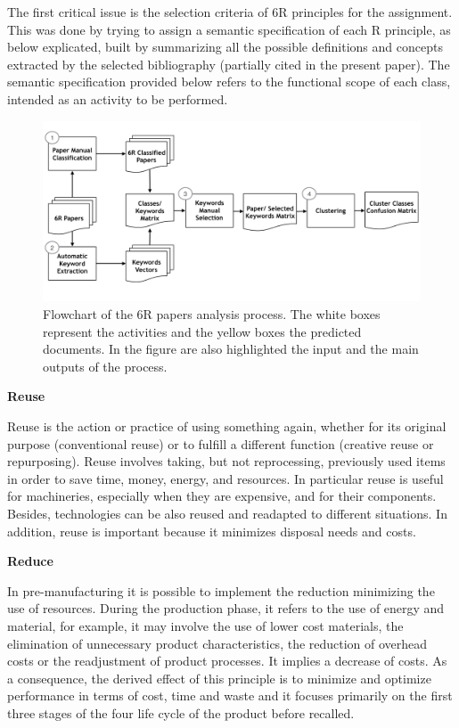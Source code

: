 \documentclass[]{book}
\begin{document}
The first critical issue is the selection criteria of 6R principles for
the assignment. This was done by trying to assign a semantic
specification of each R principle, as below explicated, built by
summarizing all the possible definitions and concepts extracted by the
selected bibliography (partially cited in the present paper). The
semantic specification provided below refers to the functional scope of
each class, intended as an activity to be performed.

\begin{figure}

{\centering \includegraphics[width=0.8\linewidth]{_bookdown_files/figures/workflow_sm} 

}

\caption{Flowchart of the 6R papers analysis process. The white boxes represent the activities and the yellow boxes the predicted documents. In the figure are also highlighted the input and the main outputs of the process.}\label{fig:wfsm}
\end{figure}

\textbf{Reuse}

Reuse is the action or practice of using something again, whether for
its original purpose (conventional reuse) or to fulfill a different
function (creative reuse or repurposing). Reuse involves taking, but not
reprocessing, previously used items in order to save time, money,
energy, and resources. In particular reuse is useful for machineries,
especially when they are expensive, and for their components. Besides,
technologies can be also reused and readapted to different situations.
In addition, reuse is important because it minimizes disposal needs and
costs.

\textbf{Reduce}

In pre-manufacturing it is possible to implement the reduction
minimizing the use of resources. During the production phase, it refers
to the use of energy and material, for example, it may involve the use
of lower cost materials, the elimination of unnecessary product
characteristics, the reduction of overhead costs or the readjustment of
product processes. It implies a decrease of costs. As a consequence, the
derived effect of this principle is to minimize and optimize performance
in terms of cost, time and waste and it focuses primarily on the first
three stages of the four life cycle of the product before recalled.
\end{document}

